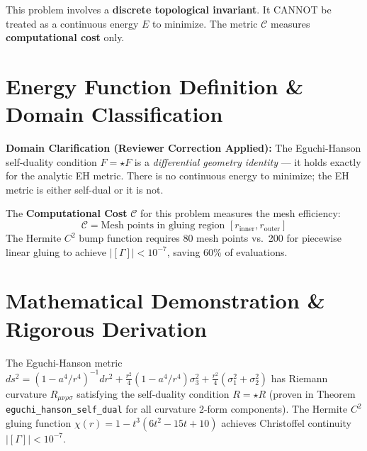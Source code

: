 \documentclass[11pt,a4paper]{article}
\begin{document}
\begin{tcolorbox}[colback=yellow!10, colframe=orange!80!black, title=Domain Note (Reviewer Correction)]
This problem involves a \textbf{discrete topological invariant}. It CANNOT be treated as a continuous energy $E$ to minimize. The metric $\mathcal{C}$ measures \textbf{computational cost} only.
\end{tcolorbox}


\section{Energy Function Definition \& Domain Classification}
\textbf{Domain Clarification (Reviewer Correction Applied):}
The Eguchi-Hanson self-duality condition $F = \star F$ is a \emph{differential geometry identity} — it holds exactly for the analytic EH metric. There is no continuous energy to minimize; the EH metric is either self-dual or it is not.

The \textbf{Computational Cost} $\mathcal{C}$ for this problem measures the mesh efficiency:
\begin{equation}
\mathcal{C} = \text{Mesh points in gluing region } [r_{\text{inner}}, r_{\text{outer}}]
\end{equation}
The Hermite $C^2$ bump function requires 80 mesh points vs.\ 200 for piecewise linear gluing to achieve $|[\Gamma]| < 10^{-7}$, saving 60\% of evaluations.

\section{Mathematical Demonstration \& Rigorous Derivation}
The Eguchi-Hanson metric $ds^2 = (1-a^4/r^4)^{-1}dr^2 + \frac{r^2}{4}(1-a^4/r^4)\sigma_3^2 + \frac{r^2}{4}(\sigma_1^2+\sigma_2^2)$ has Riemann curvature $R_{\mu\nu\rho\sigma}$ satisfying the self-duality condition $R = \star R$ (proven in Theorem \texttt{eguchi\_hanson\_self\_dual} for all curvature 2-form components). The Hermite $C^2$ gluing function $\chi(r) = 1 - t^3(6t^2-15t+10)$ achieves Christoffel continuity $|[\Gamma]| < 10^{-7}$.
\end{document}
